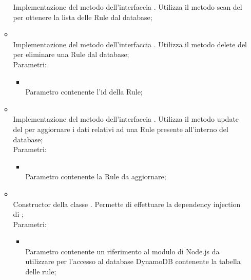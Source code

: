 \begin{itemize}
\begin{itemize}
		Implementazione del metodo dell'interfaccia . Utilizza il metodo scan del  per ottenere la lista delle Rule dal database;\\
		\item[]  \\
		Implementazione del metodo dell'interfaccia . Utilizza il metodo delete del  per eliminare una Rule dal database;\\
		Parametri:
		\begin{itemize}
			\item {} \\
			Parametro contenente l'id della Rule;
		\end{itemize}
		\item[]  \\
		Implementazione del metodo dell'interfaccia . Utilizza il metodo update del  per aggiornare i dati relativi ad una Rule presente all'interno del database;\\
		Parametri:
		\begin{itemize}
			\item {} \\
			Parametro contenente la Rule da aggiornare;
		\end{itemize}
		\item[]  \\
		Constructor della classe . Permette di effettuare la dependency injection di ;\\
		Parametri:
		\begin{itemize}
			\item {} \\
			Parametro contenente un riferimento al modulo di Node.js da utilizzare per l'accesso al database DynamoDB contenente la tabella delle rule;
		\end{itemize}
	\end{itemize}
\end{itemize}
\FloatBarrier


